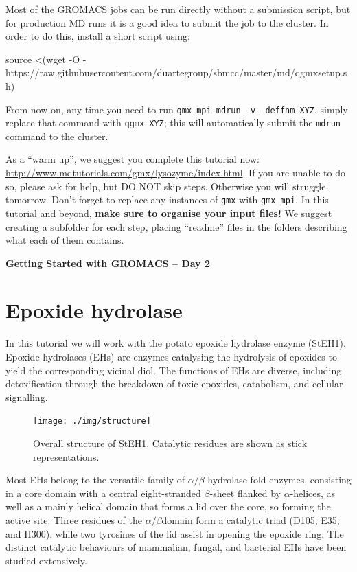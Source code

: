 \documentclass[10pt]{article}
\begin{document}
Most of the GROMACS jobs can be run directly without a submission script, but for production MD runs it is a good idea to submit the job to the cluster. In order to do this, install a short script using:

\begin{cmdline}
source <(wget -O - https://raw.githubusercontent.com/duartegroup/sbmcc/master/md/qgmxsetup.sh)
\end{cmdline}

From now on, any time you need to run \texttt{gmx\_mpi mdrun -v -deffnm XYZ}, simply replace that command with \texttt{qgmx XYZ}; this will automatically submit the \texttt{mdrun} command to the cluster.

As a ``warm up'', we suggest you complete this tutorial now: \url{http://www.mdtutorials.com/gmx/lysozyme/index.html}. If you are unable to do so, please ask for help, but DO NOT skip steps. Otherwise you will struggle tomorrow. Don't forget to replace any instances of \texttt{gmx} with \texttt{gmx\_mpi}. In this tutorial and beyond, \textbf{make sure to organise your input files!} We suggest creating a subfolder for each step, placing ``readme'' files in the folders describing what each of them contains.


\newpage\textbf{\LARGE Getting Started with GROMACS -- Day 2}

\section{Epoxide hydrolase}
In this tutorial we will work with the potato epoxide hydrolase enzyme (StEH1). Epoxide hydrolases (EHs) are enzymes catalysing the hydrolysis of epoxides to yield the corresponding vicinal diol.\autocite{Elfstrom2005} The functions of EHs are diverse, including detoxification through the breakdown of toxic epoxides, catabolism, and cellular signalling. 

\begin{figure}[H]
 \centering
 \texttt{[image: ./img/structure]}
 \caption{Overall structure of StEH1. Catalytic residues are shown as stick representations.}
\end{figure}

Most EHs belong to the versatile family of $\alpha/\beta$-hydrolase fold enzymes, consisting in a core domain with a central eight-stranded $\beta$-sheet flanked by $\alpha$-helices, as well as a mainly helical domain that forms a lid over the core, so forming the active site. Three residues of the $\alpha/\beta$domain form a catalytic triad (D105, E35, and H300), while two tyrosines of the lid assist in opening the epoxide ring. The distinct catalytic behaviours of mammalian, fungal, and bacterial EHs have been studied extensively.\autocite{Morisseau2005}
\end{document}
